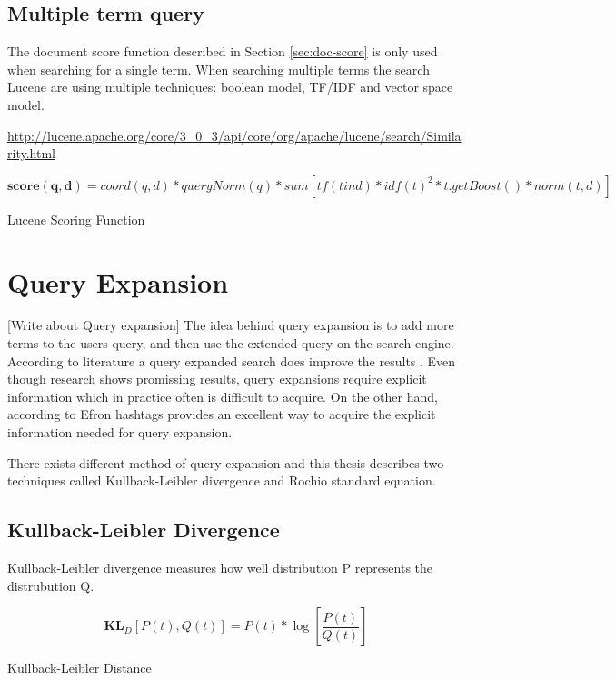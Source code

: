 \subsection{Multiple term query}
The document score function described in Section \ref{sec:doc-score} is only used when searching for a single term.
When searching multiple terms the search Lucene are using multiple techniques: boolean model, TF/IDF and vector space model.

\url{http://lucene.apache.org/core/3_0_3/api/core/org/apache/lucene/search/Similarity.html}
\begin{cequation}[H]
	\begin{equation}
		\mathbf{score(q,d)} = coord(q,d) * queryNorm(q) * sum [tf(t in d) * idf(t)^2 * t.getBoost() * norm(t,d)]
	\end{equation}
	\caption{Lucene Scoring Function}
  \label{eq:scoring-function}
\end{cequation}

\section{Query Expansion}
\label{sec:query-expansion}
[Write about Query expansion]
The idea behind query expansion is to add more terms to the users query, and then use the extended query on the search engine.
According to literature a query expanded search does improve the results \cite[ch. 5]{ir-book}.
Even though research shows promissing results, query expansions require explicit information which in practice often is difficult to acquire.
On the other hand, according to Efron \cite{ir-hashtag} hashtags provides an excellent way to acquire the explicit information needed for query expansion.

There exists different method of query expansion and this thesis describes two techniques called Kullback-Leibler divergence and Rochio standard equation.

\subsection{Kullback-Leibler Divergence}
Kullback-Leibler divergence measures how well distribution P represents the distrubution Q.

\begin{cequation}[H]
	\begin{equation}
	    \label{equ:line}
		\mathbf{KL}_D[P(t), Q(t)] = P(t)*\log{[\frac{P(t)}{Q(t)}]}
	\end{equation}
	\caption{Kullback-Leibler Distance}
  \label{kl-distance}
\end{cequation}

